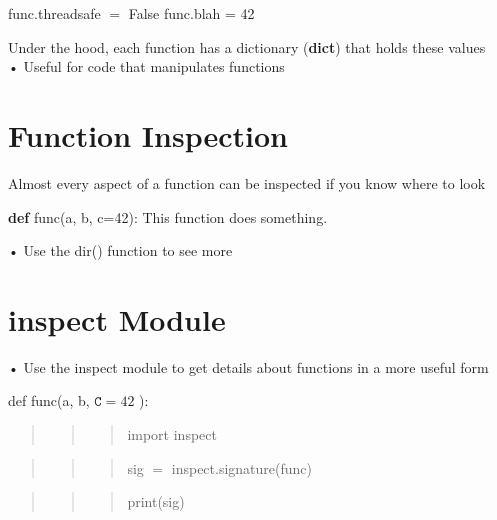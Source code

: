 \documentclass[
  letterpaper,
  DIV=11,
  numbers=noendperiod]{scrreprt}
\newenvironment{Shaded}{\begin{snugshade}}{\end{snugshade}}
\newcommand{\CommentTok}[1]{\textcolor[rgb]{0.37,0.37,0.37}{#1}}
\newcommand{\DecValTok}[1]{\textcolor[rgb]{0.68,0.00,0.00}{#1}}
\newcommand{\KeywordTok}[1]{\textcolor[rgb]{0.00,0.23,0.31}{\textbf{#1}}}
\newcommand{\NormalTok}[1]{\textcolor[rgb]{0.00,0.23,0.31}{#1}}
\newcommand{\OperatorTok}[1]{\textcolor[rgb]{0.37,0.37,0.37}{#1}}
\begin{document}
func.threadsafe \(=\) False func.blah = 42

Under the hood, each function has a dictionary (\textbf{dict}) that
holds these values\\
• Useful for code that manipulates functions


\chapter{Function Inspection}\label{function-inspection}

Almost every aspect of a function can be inspected if you know where to
look

\begin{Shaded}
\begin{Highlighting}[]
\KeywordTok{def}\NormalTok{ func(a, b, c}\OperatorTok{=}\DecValTok{42}\NormalTok{):}
    \CommentTok{\textquotesingle{}This function does something.\textquotesingle{}} 
\end{Highlighting}
\end{Shaded}

• Use the dir() function to see more


\chapter{inspect Module}\label{inspect-module}

• Use the inspect module to get details about functions in a more useful
form

def func(a, b, \(\mathtt { C } = 4 2\) ):

\begin{quote}
\begin{quote}
\begin{quote}
import inspect
\end{quote}
\end{quote}
\end{quote}

\begin{quote}
\begin{quote}
\begin{quote}
sig \(=\) inspect.signature(func)
\end{quote}
\end{quote}
\end{quote}

\begin{quote}
\begin{quote}
\begin{quote}
print(sig)
\end{quote}
\end{quote}
\end{quote}
\end{document}

